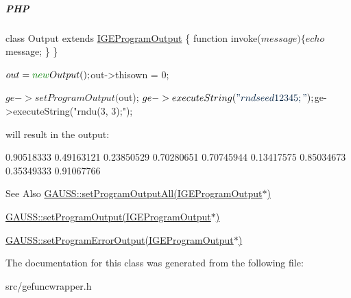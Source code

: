 \subparagraph*{P\-H\-P}


\begin{DoxyCode}
\textcolor{keyword}{class }Output \textcolor{keyword}{extends} \hyperlink{class_i_g_e_program_output}{IGEProgramOutput} \{
    \textcolor{keyword}{function} invoke($message) \{
        echo $message;
    \}
\}

$out = \textcolor{keyword}{new} Output();
$out->thisown = 0;

$ge->setProgramOutput($out);
$ge->executeString(\textcolor{stringliteral}{"rndseed 12345;"});
$ge->executeString(\textcolor{stringliteral}{"rndu(3, 3);"});
\end{DoxyCode}


will result in the output\-: 
\begin{DoxyCode}
0.90518333       0.49163121       0.23850529
0.70280651       0.70745944       0.13417575
0.85034673       0.35349333       0.91067766
\end{DoxyCode}


\begin{DoxySeeAlso}{See Also}
\hyperlink{class_g_a_u_s_s_a0b8379c48d677e05aeab433dba66fbb6}{G\-A\-U\-S\-S\-::set\-Program\-Output\-All(\-I\-G\-E\-Program\-Output$\ast$)} 

\hyperlink{class_g_a_u_s_s_a7f0dc6b5b307aa06c347f9c6a9fdacab}{G\-A\-U\-S\-S\-::set\-Program\-Output(\-I\-G\-E\-Program\-Output$\ast$)} 

\hyperlink{class_g_a_u_s_s_abd75266b2c4075da75163fe95b013ef3}{G\-A\-U\-S\-S\-::set\-Program\-Error\-Output(\-I\-G\-E\-Program\-Output$\ast$)} 
\end{DoxySeeAlso}


The documentation for this class was generated from the following file\-:\begin{DoxyCompactItemize}
\item 
src/gefuncwrapper.\-h\end{DoxyCompactItemize}
